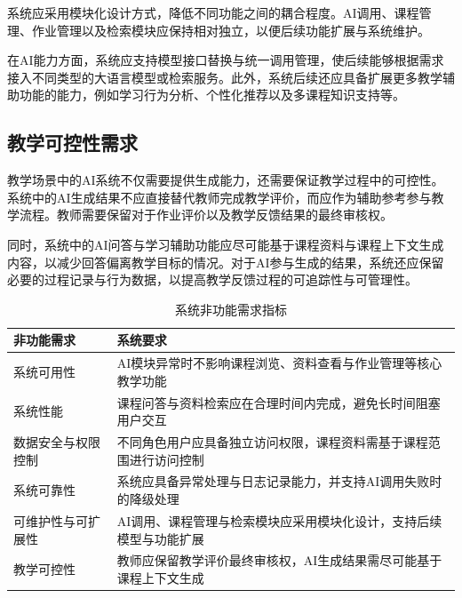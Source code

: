 \documentclass[12pt,a4paper,oneside]{ctexbook}
\numberwithin{equation}{chapter}
\begin{document}
系统应采用模块化设计方式，降低不同功能之间的耦合程度。AI调用、课程管理、作业管理以及检索模块应保持相对独立，以便后续功能扩展与系统维护。

在AI能力方面，系统应支持模型接口替换与统一调用管理，使后续能够根据需求接入不同类型的大语言模型或检索服务。此外，系统后续还应具备扩展更多教学辅助功能的能力，例如学习行为分析、个性化推荐以及多课程知识支持等。

\subsection{教学可控性需求}

教学场景中的AI系统不仅需要提供生成能力，还需要保证教学过程中的可控性。系统中的AI生成结果不应直接替代教师完成教学评价，而应作为辅助参考参与教学流程。教师需要保留对于作业评价以及教学反馈结果的最终审核权。

同时，系统中的AI问答与学习辅助功能应尽可能基于课程资料与课程上下文生成内容，以减少回答偏离教学目标的情况。对于AI参与生成的结果，系统还应保留必要的过程记录与行为数据，以提高教学反馈过程的可追踪性与可管理性。

\begin{table}[H]
\centering
\caption{系统非功能需求指标}
\label{tab:nonfunctional}
\begin{tabular}{p{4cm} p{10.5cm}}
\toprule
非功能需求 & 系统要求 \\
\midrule

系统可用性 &
AI模块异常时不影响课程浏览、资料查看与作业管理等核心教学功能 \\

系统性能 &
课程问答与资料检索应在合理时间内完成，避免长时间阻塞用户交互 \\

数据安全与权限控制 &
不同角色用户应具备独立访问权限，课程资料需基于课程范围进行访问控制 \\

系统可靠性 &
系统应具备异常处理与日志记录能力，并支持AI调用失败时的降级处理 \\

可维护性与可扩展性 &
AI调用、课程管理与检索模块应采用模块化设计，支持后续模型与功能扩展 \\

教学可控性 &
教师应保留教学评价最终审核权，AI生成结果需尽可能基于课程上下文生成 \\

\bottomrule
\end{tabular}
\end{table}
\end{document}
